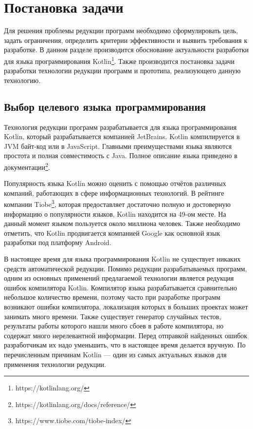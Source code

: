 \chapter{Постановка задачи}
Для решения проблемы редукции программ необходимо сформулировать цель, задать ограничения, определить критерии эффективности и выявить требования к разработке. В данном разделе производится обоснование актуальности разработки для языка программирования Kotlin\footnote{https://kotlinlang.org/}. Также производится постановка задачи разработки технологии редукции программ и прототипа, реализующего данную технологию.

\section{Выбор целевого языка программирования}
Технология редукции программ разрабатывается для языка программирования Kotlin, который разрабатывается компанией JetBrains. Kotlin компилируется в JVM байт-код или в JavaScript. Главными преимуществами языка являются простота и полная совместимость с Java. Полное описание языка приведено в документации\footnote{https://kotlinlang.org/docs/reference/}.

Популярность языка Kotlin можно оценить с помощью отчётов раз­личных компаний, работающих в сфере информационных технологий. В рейтинге компании Tiobe\footnote{https://www.tiobe.com/tiobe-index/}, которая предоставляет достаточно полную и достоверную информацию о популярности языков, Kotlin находится на 49-ом месте. На данный момент языком пользуется около миллиона человек. Также необходимо отметить, что Kotlin продвигается компанией Google как основной язык разработки под платформу Android. 

В настоящее время для языка программирования Kotlin не существует никаких средств автоматической редукции. Помимо редукции разрабатываемых программ, одним из основных применений предлагаемой технологии является редукция ошибок компилятора Kotlin. Компилятор языка разрабатывается сравнительно небольшое количество времени, поэтому часто при разработке программ возникают ошибки компилятора, локализация которых в больших проектах может занимать много времени. Также существует генератор случайных тестов, результаты работы которого нашли много сбоев в работе компилятора, но содержат много нерелевантной информации. Перед отправкой найденных ошибок разработчикам их надо уменьшить, что в настоящее время делается вручную. По перечисленным причинам Kotlin --- один из самых актуальных языков для применения технологии редукции.
